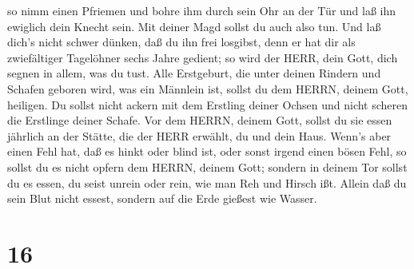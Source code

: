  so nimm einen Pfriemen und bohre ihm durch sein Ohr an der
Tür und laß ihn ewiglich dein Knecht sein. Mit deiner Magd sollst du
auch also tun.  Und laß dich's nicht schwer dünken, daß du
ihn frei losgibst, denn er hat dir als zwiefältiger Tagelöhner sechs
Jahre gedient; so wird der HERR, dein Gott, dich segnen in allem, was du
tust.  Alle Erstgeburt, die unter deinen Rindern und
Schafen geboren wird, was ein Männlein ist, sollst du dem HERRN, deinem
Gott, heiligen. Du sollst nicht ackern mit dem Erstling deiner Ochsen
und nicht scheren die Erstlinge deiner Schafe.  Vor dem
HERRN, deinem Gott, sollst du sie essen jährlich an der Stätte, die der
HERR erwählt, du und dein Haus.  Wenn's aber einen Fehl
hat, daß es hinkt oder blind ist, oder sonst irgend einen bösen Fehl, so
sollst du es nicht opfern dem HERRN, deinem Gott;  sondern
in deinem Tor sollst du es essen, du seist unrein oder rein, wie man Reh
und Hirsch ißt.  Allein daß du sein Blut nicht essest,
sondern auf die Erde gießest wie Wasser.

\hypertarget{section-15}{%
\section{16}\label{section-15}}

